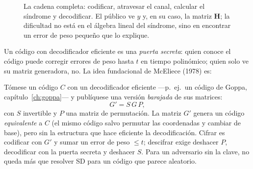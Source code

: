 \documentclass[11pt,a4paper,oneside]{report}
\newcommand{\wt}{\operatorname{wt}}
\newcommand{\Hmat}{\mathbf{H}}          %
\begin{document}
\begin{figure}[htbp]
\centering
{}
\caption{La cadena completa: codificar, atravesar el canal, calcular el
síndrome y decodificar. El público ve $y$ y, en su caso, la matriz $\Hmat$;
la dificultad no está en el álgebra lineal del síndrome, sino en encontrar
un error de peso pequeño que lo explique.}
\label{fig:pipeline}
\end{figure}

Un código con decodificador eficiente es una \emph{puerta secreta}: quien
conoce el código puede corregir errores de peso hasta $t$ en tiempo
polinómico; quien solo ve su matriz generadora, no. La idea fundacional de
McEliece (1978) es:

\begin{idea}
Tómese un código $C$ con un decodificador eficiente ---p.~ej.\ un código
de Goppa, capítulo~\ref{ch:goppa}--- y publíquese una versión
\emph{barajada} de sus matrices:
\[
G' = S\,G\,P,
\]
con $S$ invertible y $P$ una matriz de permutación. La matriz $G'$ genera
un código \emph{equivalente} a $C$ (el mismo código salvo permutar las
coordenadas y cambiar de base), pero sin la estructura que hace eficiente
la decodificación. Cifrar es codificar con $G'$ y sumar un error de peso
$\le t$; descifrar exige deshacer $P$, decodificar con la puerta secreta y
deshacer $S$. Para un adversario sin la clave, no queda más que resolver SD
para un código que parece aleatorio.
\end{idea}
\end{document}
